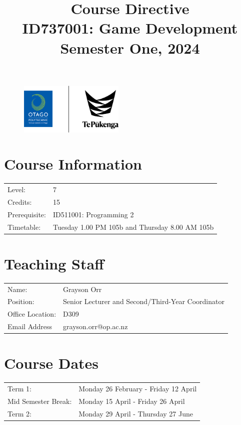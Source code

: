 \documentclass{article}
\author{}
\begin{document}
\begin{figure}
	\includegraphics[width=50mm]{../img/logo.png} 
\end{figure}


\title{Course Directive\\ID737001: Game Development\\Semester One, 2024}
\date{}
\maketitle

\section*{Course Information}
\begin{tabular}{ll}
	Level:        & 7 \\
	Credits:      & 15                                                             \\
	Prerequisite: & ID511001: Programming 2                                  \\
	Timetable:    & Tuesday 1.00 PM 105b and Thursday 8.00 AM 105b     
\end{tabular}

\section*{Teaching Staff}
\begin{tabular}{ll}
	Name:            & Grayson Orr                           \\
	Position:        & Senior Lecturer and Second/Third-Year Coordinator\\
	Office Location: & D309                                 \\
	Email Address    & grayson.orr@op.ac.nz                    
\end{tabular}

\section*{Course Dates}
\begin{tabular}{ll}
	Term 1:           & Monday 26 February - Friday 12 April  \\
	Mid Semester Break: &  Monday 15 April  - Friday 26 April     \\
	Term 2:             & Monday 29 April - Thursday 27 June       \\
\end{tabular}
\end{document}
